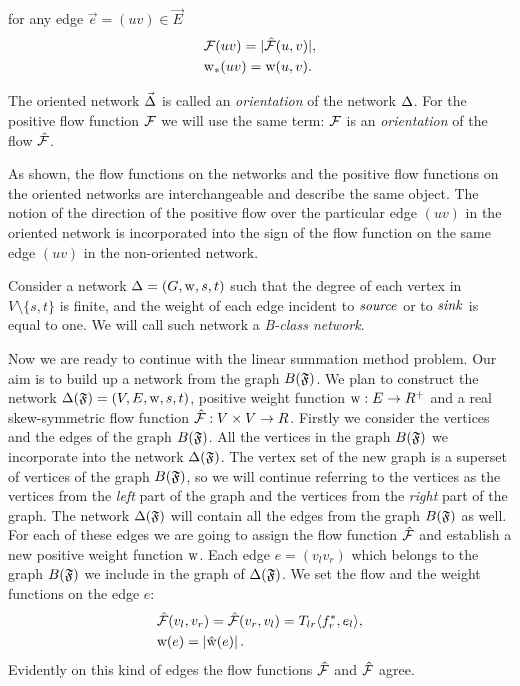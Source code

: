 \documentclass[12pt]{article}
\begin{document}
    for any edge $\vec{e} = (uv) \in \vec{E}$
    \begin{align*}
      &\mathcal{F}(uv) = |\mathcal{\hat{F}}(u,v)|,\\
      &\mathrm{w}_{*}(uv) = \mathrm{w}(u,v).
    \end{align*}
    \begin{definition}
      The oriented network $\vec{\Delta}$ is called an \emph{orientation} of the network $\Delta$.
      For the positive flow function $\mathcal{F}$ we will use the same term:
        $\mathcal{F}$ is an \emph{orientation} of the flow $\mathcal{\hat{F}}$.
    \end{definition}
    \begin{remark}
      As shown, the flow functions on the networks and the positive flow functions on the oriented networks
        are interchangeable and describe the same object.
      The notion of the direction of the positive flow over the particular edge $(uv)$ in the oriented network
        is incorporated into the sign of the flow function on the same edge $(uv)$ in the non-oriented network.
    \end{remark}
    \begin{definition}
      Consider a network $\Delta = (G, \mathrm{w}, s, t)$ such that
        the degree of each vertex in $V \setminus \{s, t\} $ is finite,
        and the weight of each edge incident to $\mathit{source}$ or to $\mathit{sink}$ is equal to one.
      We will call such network a \emph{B-class network}.
    \end{definition}
    
    Now we are ready to continue with the linear summation method problem.
    Our aim is to build up a network from the graph $B(\mathfrak{F})$.
    We plan to construct the network $\Delta(\mathfrak{F}) = (V, E, \mathrm{w}, s, t)$,
    positive weight function $\mathrm{w}: E \to R^{+}$ and a real skew-symmetric flow function $\mathcal{\hat{F}}: V \times V \to R$.
    Firstly we consider the vertices and the edges of the graph $B(\mathfrak{F})$.
    All the vertices in the graph $B(\mathfrak{F})$ we incorporate into the network $\Delta(\mathfrak{F})$.
    The vertex set of the new graph is a superset of vertices of the graph $B(\mathfrak{F})$,
    so we will continue referring to the vertices as the vertices from 
    the \emph{left} part of the graph and the vertices from the \emph{right} part of the graph.
    The network $\Delta(\mathfrak{F})$ will contain all the edges from the graph $B(\mathfrak{F})$ as well.
    For each of these edges we are going to assign the flow function $\mathcal{\hat{F}}$ and
    establish a new positive weight function $\mathrm{w}$.
    Each edge $e = (v_l v_r)$ which belongs to the graph $B(\mathfrak{F})$ we include in the graph of $\Delta(\mathfrak{F})$.
    We set the flow and the weight functions on the edge $e$:
    \begin{align*}
      &\mathcal{\hat{F}}(v_l, v_r) = \mathcal{\hat{F}}(v_r, v_l) = T_{lr} \langle f^*_r, e_l \rangle,\\
      &\mathrm{w}(e) = \left| \mathrm{\hat{w}}(e) \right|.
    \end{align*}
    Evidently on this kind of edges the flow functions $\mathcal{\hat{F}}$ and $\mathcal{\hat{F}}$ agree.
    
\end{document}
